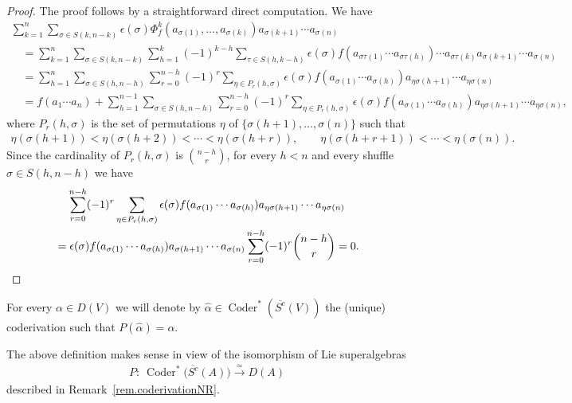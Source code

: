 \documentclass[pdftex]{sigma}
\newcommand{\Coder}{\operatorname{Coder}}
\numberwithin{equation}{section}
\begin{document}
\begin{proof} The proof follows by a straightforward direct computation. We have
\begin{gather*}
\sum_{k=1}^n\sum_{\sigma\in S(k,n-k)}\epsilon(\sigma)
\Phi^k_f(a_{\sigma(1)},\ldots, a_{\sigma(k)})a_{\sigma(k+1)}\cdots a_{\sigma(n)} \\
\quad{} =\sum_{k=1}^n\sum_{\sigma\in S(k,n-k)}\sum_{h=1}^k(-1)^{k-h}\sum_{\tau\in S(h,k-h)}
\epsilon(\sigma)
f(a_{\sigma\tau(1)}\cdots a_{\sigma\tau(h)})\cdots a_{\sigma\tau(k)}a_{\sigma(k+1)}\cdots a_{\sigma(n)}\\
\quad{} =\sum_{h=1}^n\sum_{\sigma\in S(h,n-h)}\sum_{r=0}^{n-h}(-1)^{r}\sum_{\eta\in P_r(h,\sigma)}
\epsilon(\sigma)
f(a_{\sigma(1)}\cdots a_{\sigma(h)})a_{\eta\sigma(h+1)}\cdots a_{\eta\sigma(n)}\\
\quad {} =f(a_1\cdots a_n)+\sum_{h=1}^{n-1}\sum_{\sigma\in S(h,n-h)}\sum_{r=0}^{n-h}(-1)^{r}\sum_{\eta\in P_r(h,\sigma)}
\epsilon(\sigma)
f(a_{\sigma(1)}\cdots a_{\sigma(h)})a_{\eta\sigma(h+1)}\cdots a_{\eta\sigma(n)},
\end{gather*}
where $P_r(h,\sigma)$ is the set of permutations $\eta$ of $\{\sigma(h+1),\ldots,\sigma(n)\}$ such that
\begin{gather*} \eta(\sigma(h+1))<\eta(\sigma(h+2))<\cdots <\eta(\sigma(h+r)),\qquad %
\eta(\sigma(h+r+1))<\cdots <\eta(\sigma(n)).\end{gather*}
Since the cardinality of $P_r(h,\sigma)$ is $\binom{n-h}{r}$, for every $h<n$ and every shuf\/f\/le $\sigma\in S(h,n-h)$ we have
\begin{gather*}
\sum_{r=0}^{n-h}(-1)^{r}\sum_{\eta\in P_r(h,\sigma)}
\epsilon(\sigma)
f(a_{\sigma(1)}\cdots a_{\sigma(h)})a_{\eta\sigma(h+1)}\cdots a_{\eta\sigma(n)} \\
\qquad {} =\epsilon(\sigma) f(a_{\sigma(1)}\cdots a_{\sigma(h)})a_{\sigma(h+1)}\cdots a_{\sigma(n)}
\sum_{r=0}^{n-h}(-1)^{r}\dbinom{n-h}{r}=0.\tag*{\qed}
\end{gather*}
\renewcommand{\qed}{}
\end{proof}

\begin{Definition} For every $\alpha\in D(V)$ we will denote by $\widehat{\alpha}\in \Coder^*(\overline{S^c}(V))$ the (unique) coderivation such that
$P(\widehat{\alpha})=\alpha$.
\end{Definition}

The above def\/inition makes sense in view of the isomorphism of Lie superalgebras
\begin{gather*} P\colon \ \Coder^*\big(\overline{S^c}(A)\big)\xrightarrow{ \simeq } D(A)\end{gather*}
described in Remark~\ref{rem.coderivationNR}.
\end{document}
